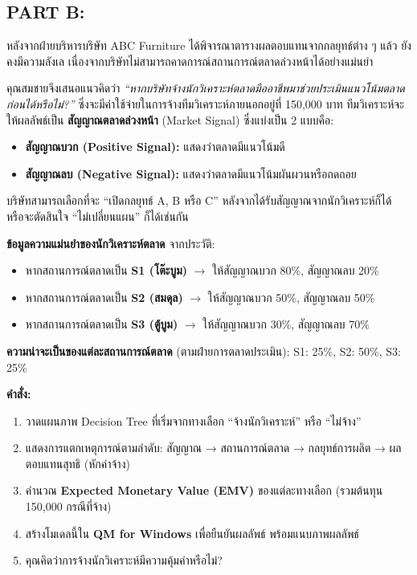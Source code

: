 \subsection*{PART B:}
หลังจากฝ่ายบริหารบริษัท ABC Furniture ได้พิจารณาตารางผลตอบแทนจากกลยุทธ์ต่าง ๆ แล้ว  
ยังคงมีความลังเล เนื่องจากบริษัทไม่สามารถคาดการณ์สถานการณ์ตลาดล่วงหน้าได้อย่างแม่นยำ

คุณสมชายจึงเสนอแนวคิดว่า \emph{“หากบริษัทจ้างนักวิเคราะห์ตลาดมืออาชีพมาช่วยประเมินแนวโน้มตลาดก่อนได้หรือไม่?”}  
ซึ่งจะมีค่าใช้จ่ายในการจ้างทีมวิเคราะห์ภายนอกอยู่ที่ 150,000 บาท  
ทีมวิเคราะห์จะให้ผลลัพธ์เป็น \textbf{สัญญาณตลาดล่วงหน้า} (Market Signal) ซึ่งแบ่งเป็น 2 แบบคือ:

\begin{itemize}
    \item \textbf{สัญญาณบวก (Positive Signal):} แสดงว่าตลาดมีแนวโน้มดี
    \item \textbf{สัญญาณลบ (Negative Signal):} แสดงว่าตลาดมีแนวโน้มผันผวนหรือถดถอย
\end{itemize}

บริษัทสามารถเลือกที่จะ “เปิดกลยุทธ์ A, B หรือ C” หลังจากได้รับสัญญาณจากนักวิเคราะห์ก็ได้  
หรือจะตัดสินใจ “ไม่เปลี่ยนแผน” ก็ได้เช่นกัน

\medskip
\noindent
\textbf{ข้อมูลความแม่นยำของนักวิเคราะห์ตลาด} จากประวัติ:
\begin{itemize}
    \item หากสถานการณ์ตลาดเป็น \textbf{S1 (โต๊ะบูม)} $\rightarrow$ ให้สัญญาณบวก 80\%, สัญญาณลบ 20\%
    \item หากสถานการณ์ตลาดเป็น \textbf{S2 (สมดุล)} $\rightarrow$ ให้สัญญาณบวก 50\%, สัญญาณลบ 50\%
    \item หากสถานการณ์ตลาดเป็น \textbf{S3 (ตู้บูม)} $\rightarrow$ ให้สัญญาณบวก 30\%, สัญญาณลบ 70\%
\end{itemize}

\noindent
\textbf{ความน่าจะเป็นของแต่ละสถานการณ์ตลาด} (ตามฝ่ายการตลาดประเมิน):  
S1: 25\%, S2: 50\%, S3: 25\%

\medskip
\noindent
\textbf{คำสั่ง:}

\begin{enumerate}
    \item วาดแผนภาพ Decision Tree ที่เริ่มจากทางเลือก “จ้างนักวิเคราะห์” หรือ “ไม่จ้าง”
    \item แสดงการแตกเหตุการณ์ตามลำดับ: สัญญาณ → สถานการณ์ตลาด → กลยุทธ์การผลิต → ผลตอบแทนสุทธิ (หักค่าจ้าง)
    \item คำนวณ \textbf{Expected Monetary Value (EMV)} ของแต่ละทางเลือก (รวมต้นทุน 150,000 กรณีที่จ้าง)
    \item สร้างโมเดลนี้ใน \textbf{QM for Windows} เพื่อยืนยันผลลัพธ์ พร้อมแนบภาพผลลัพธ์
    \item คุณคิดว่าการจ้างนักวิเคราะห์มีความคุ้มค่าหรือไม่?
\end{enumerate}